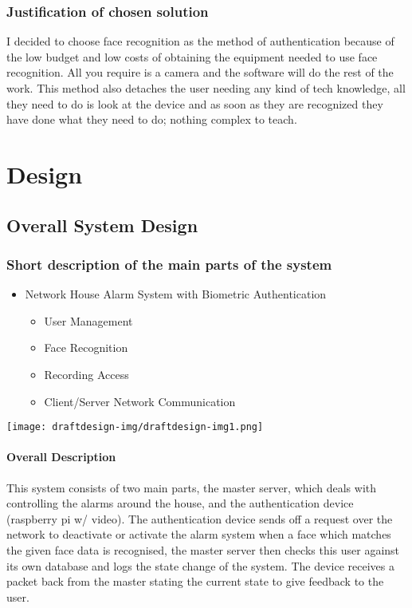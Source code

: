 \documentclass[12pt,a4paper]{report}
\begin{document}
\subsection{Justification of chosen solution}\label{section:_Toc370402538}
I decided to choose face recognition as the method of authentication 
because of the low budget and low costs of obtaining the equipment 
needed to use face recognition. All you require is a camera and the 
software will do the rest of the work. This method also detaches the 
user needing any kind of tech knowledge, all they need to do is look at 
the device and as soon as they are recognized they have done what they 
need to do; nothing complex to teach. 

\chapter{Design}

\section[Overall System Design]{Overall System Design}
\subsection[Short description of the main parts of the system]{Short description of the main parts of the system}

\begin{itemize}
\item Network House Alarm System with Biometric Authentication

\begin{itemize}
\item User Management
\item Face Recognition
\item Recording Access
\item Client/Server Network Communication
\end{itemize}
\end{itemize}
 \texttt{[image: draftdesign-img/draftdesign-img1.png]} 

\subsubsection[Overall Description]{Overall Description}
This system consists of two main parts, the master server, which deals with controlling the alarms around the house, and the authentication device (raspberry pi w/ video). The authentication device sends off a request over the network to deactivate or activate the alarm system when a face which matches the given face data is recognised, the master server then checks this user against its own database and logs the state change of the system. The device receives a packet back from the master stating the current state to give feedback to the user. 
\end{document}
